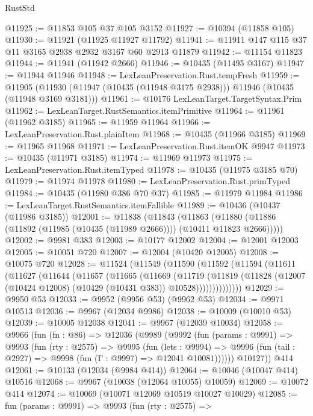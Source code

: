 \begin{lexlean}{RustStd}
\begin{coremodule}
{\begin{coremodule}
{{{{{{{{{{{{{{{{{{{{{{{{{{{{{{{{{{{{{{{{{{{{{{{{{{{{{{{{{{{{{{{{{{{{{{{{{{{{{{@11925 := @11853 @105 @37 @105 @3152
@11927 := @10394 (@11858 @105)
@11930 := @11921 (@11925 @11927 @11792)
@11941 := @11911 @147 @115 @37 @11 @3165 @2938 @2932 @3167 @60 @2913 @11879
@11942 := @11154 @11823
@11944 := @11941 (@11942 @2666)
@11946 := @10435 (@11495 @3167)
@11947 := @11944 @11946
@11948 := LexLeanPreservation.Rust.tempFresh
@11959 := @11905
    (@11930 (@11947 (@10435 (@11948 @3175 @2938))) @11946 (@10435 (@11948 @3169 @3181)))
@11961 := @10176 LexLeanTarget.TargetSyntax.Prim
@11962 := LexLeanTarget.RustSemantics.itemPrimitive
@11964 := @11961 (@11962 @3185)
@11965 := @11959 @11964
@11966 := LexLeanPreservation.Rust.plainItem
@11968 := @10435 (@11966 @3185)
@11969 := @11965 @11968
@11971 := LexLeanPreservation.Rust.itemOK @9947
@11973 := @10435 (@11971 @3185)
@11974 := @11969 @11973
@11975 := LexLeanPreservation.Rust.itemTyped
@11978 := @10435 (@11975 @3185 @70)
@11979 := @11974 @11978
@11980 := LexLeanPreservation.Rust.primTyped
@11984 := @10435 (@11980 @386 @70 @37)
@11985 := @11979 @11984
@11986 := LexLeanTarget.RustSemantics.itemFallible
@11989 := @10436 (@10437 (@11986 @3185))
@12001 := @11838
    (@11843
      (@11863 (@11880 (@11886 (@11892 (@11985 (@10435 (@11989 @2666)))) (@10411 @11823 @2666)))))
@12002 := @9981 @383
@12003 := @10177 @12002
@12004 := @12001 @12003
@12005 := @10051 @720
@12007 := @12004 (@10420 @12005)
@12008 := @10075 @720
@12028 := @11524
    (@11549
      (@11590
        (@11592
          (@11594
            (@11611
              (@11627
                (@11644
                  (@11657
                    (@11665
                      (@11669
                        (@11719
                          (@11819
                            (@11828
                              (@12007 (@10424 @12008) (@10429 (@10431 @383)) @10528))))))))))))))
@12029 := @9950 @53
@12033 := @9952 (@9956 @53) (@9962 @53)
@12034 := @9971 @10513
@12036 := @9967 (@12034 @9986)
@12038 := @10009 (@10010 @53)
@12039 := @10005 @12038
@12041 := @9967 (@12039 @10034)
@12058 := @9966
    (fun (fn : @86) =>
    @12036
      (@9989
        (@9992
          (fun (params : @9991) =>
          @9993
            (fun (rty : @2575) =>
            @9995
              (fun (lets : @9994) =>
              @9996 (fun (tail : @2927) => @9998 (fun (Γ : @9997) => @12041 @10081))))))
        @10127))
    @414
@12061 := @10133 (@12034 (@9984 @414))
@12064 := @10046 (@10047 @414) @10516
@12068 := @9967 (@10038 (@12064 @10055) @10059)
@12069 := @10072 @414
@12074 := @10069 (@10071 @12069 @10519 @10027 @10029)
@12085 := fun (params : @9991) =>
  @9993
    (fun (rty : @2575) =>
}}}}}}}}}}}}}}}}}}}}}}}}}}}}}}}}}}}}}}}}}}}}}}}}}}}}}}}}}}}}}}}}}}}}}}}}}}}}}}
\end{coremodule}}
\end{coremodule}
\end{lexlean}
